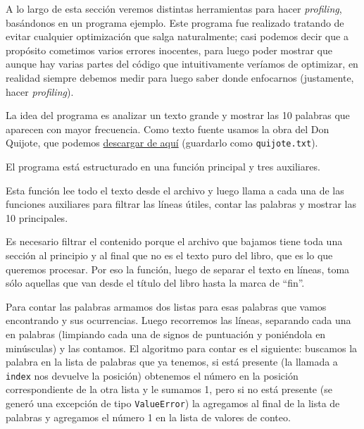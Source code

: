 A lo largo de esta sección veremos distintas herramientas para hacer \textit{profiling}, basándonos en un programa ejemplo. Este programa fue realizado tratando de evitar cualquier optimización que salga naturalmente; casi podemos decir que a propósito cometimos varios errores inocentes, para luego poder mostrar que aunque hay varias partes del código que intuitivamente veríamos de optimizar, en realidad siempre debemos medir para luego saber donde enfocarnos (justamente, hacer \textit{profiling}).

La idea del programa es analizar un texto grande y mostrar las 10 palabras que aparecen con mayor frecuencia. Como texto fuente usamos la obra del Don Quijote, que podemos \href{https://www.gutenberg.org/cache/epub/2000/pg2000.txt}{descargar de aquí} (guardarlo como \texttt{quijote.txt}).

El programa está estructurado en una función principal y tres auxiliares.


Esta función lee todo el texto desde el archivo y luego llama a cada una de las funciones auxiliares para filtrar las líneas útiles, contar las palabras y mostrar las 10 principales.


Es necesario filtrar el contenido porque el archivo que bajamos tiene toda una sección al principio y al final que no es el texto puro del libro, que es lo que queremos procesar. Por eso la función, luego de separar el texto en líneas, toma sólo aquellas que van desde el título del libro hasta la marca de ``fin''.


Para contar las palabras armamos dos listas para esas palabras que vamos encontrando y sus ocurrencias. Luego recorremos las líneas, separando cada una en palabras (limpiando cada una de signos de puntuación y poniéndola en minúsculas) y las contamos. El algoritmo para contar es el siguiente: buscamos la palabra en la lista de palabras que ya tenemos, si está presente (la llamada a \texttt{index} nos devuelve la posición) obtenemos el número en la posición correspondiente de la otra lista y le sumamos 1, pero si no está presente (se generó una excepción de tipo \texttt{ValueError}) la agregamos al final de la lista de palabras y agregamos el número 1 en la lista de valores de conteo.

